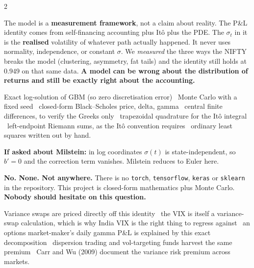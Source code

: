 \documentclass[12pt,a4paper]{extarticle}
\begin{document}
\begin{multicols}{2}
\begin{qb}
\scriptsize
The model is a \textbf{measurement framework}, not a claim about reality. The P\&L identity
comes from self-financing accounting plus It\^o plus the PDE. The $\sigma_t$ in it is the
\textbf{realised} volatility of whatever path actually happened. It never uses normality,
independence, or constant $\sigma$. We \emph{measured} the three ways the NIFTY breaks the
model (clustering, asymmetry, fat tails) and the identity still holds at $0.949$ on that same
data. \textbf{A model can be wrong about the distribution of returns and still be exactly right
about the accounting.}
\end{qb}

\columnbreak

\begin{qb}
\scriptsize
Exact log-solution of GBM (so zero discretisation error) \textbullet\ Monte Carlo with a fixed
seed \textbullet\ closed-form Black--Scholes price, delta, gamma \textbullet\ central finite
differences, to verify the Greeks only \textbullet\ trapezoidal quadrature for the It\^o
integral \textbullet\ left-endpoint Riemann sums, as the It\^o convention requires \textbullet\
ordinary least squares written out by hand.

\textbf{If asked about Milstein:} in log coordinates $\sigma(t)$ is state-independent, so
$b'=0$ and the correction term vanishes. Milstein reduces to Euler here.
\end{qb}

\begin{tb}
\scriptsize
\textbf{No. None. Not anywhere.} There is no \texttt{torch}, \texttt{tensorflow},
\texttt{keras} or \texttt{sklearn} in the repository. This project is closed-form mathematics
plus Monte Carlo. \textbf{Nobody should hesitate on this question.}
\end{tb}

\begin{qb}
\scriptsize
Variance swaps are priced directly off this identity \textbullet\ the VIX is itself a
variance-swap calculation, which is why India VIX is the right thing to regress against
\textbullet\ an options market-maker's daily gamma P\&L is explained by this exact
decomposition \textbullet\ dispersion trading and vol-targeting funds harvest the same premium
\textbullet\ Carr and Wu (2009) document the variance risk premium across markets.
\end{qb}


\end{multicols}
\end{document}
